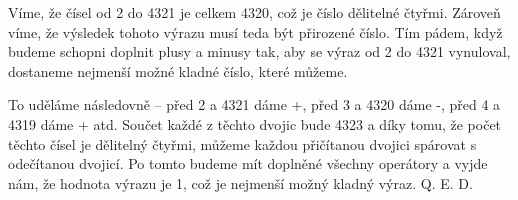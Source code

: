 \documentclass{fkssolpub}
\author{Ondřej Sedláček}
\begin{document}
Víme, že čísel od 2 do 4321 je celkem 4320, což je číslo dělitelné čtyřmi. Zároveň víme, že výsledek tohoto výrazu musí teda být přirozené číslo. Tím pádem, když budeme schopni doplnit plusy a minusy tak, aby se výraz od 2 do 4321 vynuloval, dostaneme nejmenší možné kladné číslo, které můžeme.

To uděláme následovně -- před 2 a 4321 dáme +, před 3 a 4320 dáme -, před 4 a 4319 dáme + atd. Součet každé z těchto dvojic bude 4323 a díky tomu, že počet těchto čísel je dělitelný čtyřmi, můžeme každou přičítanou dvojici spárovat s odečítanou dvojicí. Po tomto budeme mít doplněné všechny operátory a vyjde nám, že hodnota výrazu je 1, což je nejmenší možný kladný výraz. Q. E. D.
\end{document}
